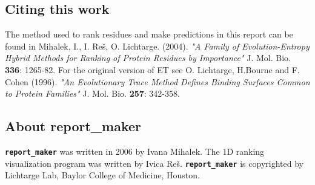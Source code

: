 \subsection{Citing this work}
The method used to rank residues and make predictions in this report can be found in 
Mihalek, I., I. Re\v{s}, O. Lichtarge. (2004).
\emph {"A Family of Evolution-Entropy Hybrid Methods for Ranking of Protein Residues by Importance" }
J. Mol. Bio. {\bf 336}: 1265-82.
For the original version of ET see
O. Lichtarge, H.Bourne and F. Cohen  (1996).
\emph {"An Evolutionary Trace Method Defines Binding Surfaces Common to Protein Families" }
J. Mol. Bio. {\bf 257}: 342-358.


\subsection{About report\_maker} 
{\tt \bf report\_maker} was written in 2006 by Ivana Mihalek. The 1D ranking visualization
program was written by Ivica Re\v{s}.
 {\tt \bf report\_maker} is copyrighted by Lichtarge Lab,
Baylor College of Medicine, Houston.


